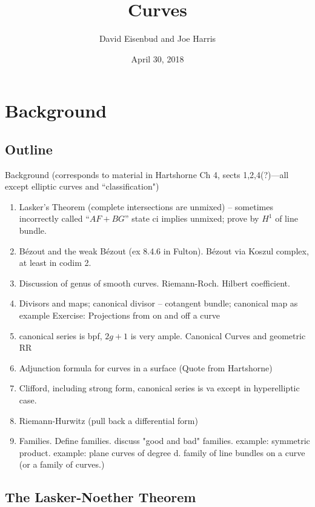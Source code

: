 \documentclass[12pt, leqno]{book}
\date{April 30, 2018}
\title{Curves}
\author{David Eisenbud and Joe Harris }
\begin{document}
\chapter{Background}
\section*{Outline}
 Background (corresponds to material in Hartshorne Ch 4, sects 1,2,4(?)---all except elliptic curves and ``classification")
\begin{enumerate}

\item Lasker's Theorem (complete intersections are unmixed) -- sometimes incorrectly called ``$AF+BG$''
state ci implies unmixed; prove by $H^1$ of line bundle.

\item B\'ezout and the  weak B\'ezout (ex 8.4.6 in Fulton).
B\'ezout via Koszul complex, at least in codim 2.

\item Discussion of genus of smooth curves. Riemann-Roch. Hilbert coefficient.

\item Divisors and maps; canonical divisor -- cotangent bundle; canonical map as example
Exercise: Projections from on and off a curve

\item canonical series is bpf, $2g+1$ is very ample. Canonical Curves and geometric RR

\item Adjunction formula for curves in a surface (Quote from Hartshorne)

\item Clifford, including strong form, canonical series is va except in hyperelliptic case.

\item Riemann-Hurwitz (pull back a differential form)

\item Families. Define families. discuss "good and bad" families. example: symmetric product. example: plane curves of degree d. family of line bundles on a curve (or a family of curves.)


\end{enumerate}

\section{The Lasker-Noether Theorem}
\end{document}
